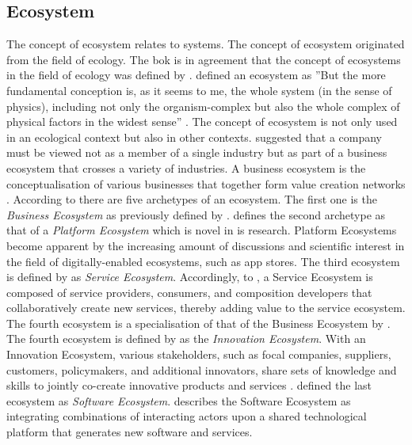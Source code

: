 \subsection{Ecosystem}
\label{sub:tbecosystem}
The concept of ecosystem relates to systems. The concept of ecosystem originated from the field of ecology. The \acrfull{bok} is in agreement that the concept of ecosystems in the field of ecology was defined by \textcite{Tansley1935}. \textcite[p.~299]{Tansley1935} defined an ecosystem as ''But the more fundamental conception is, as it seems to me, the whole system (in the sense of physics), including not only the organism-complex but also the whole complex of physical factors in the widest sense'' \parencites[p.~3]{Guggenberger2020}[p.~20]{Nurmi2021}. The concept of ecosystem is not only used in an ecological context but also in other contexts. \textcite[p.~76]{Moore1993} suggested that a company must be viewed not as a member of a single industry but as part of a business ecosystem that crosses a variety of industries. A business ecosystem is the conceptualisation of various businesses that together form value creation networks \parencite[p.~3]{Guggenberger2020}. According to \textcite[]{Guggenberger2020} there are five archetypes of an ecosystem. The first one is the \textit{Business Ecosystem} as previously defined by \textcite[p.~76]{Moore1993}. \textcite[p.~5]{Guggenberger2020} defines the second archetype as that of a \textit{Platform Ecosystem} which is novel in \acrfull{is} research. Platform Ecosystems become apparent by the increasing amount of discussions and scientific interest in the field of digitally-enabled ecosystems, such as app stores. The third ecosystem is defined by \textcite[p.~5]{Guggenberger2020} as \textit{Service Ecosystem}. Accordingly, to \textcites{Barros2006}{Papazoglou2006}{Huang2014}, a Service Ecosystem is composed of service providers, consumers, and composition developers that collaboratively create new services, thereby adding value to the service ecosystem. The fourth ecosystem is a specialisation of that of the Business Ecosystem by \textcite{Moore1993}. The fourth ecosystem is defined by \textcite[p.~5]{Guggenberger2020} as the \textit{Innovation Ecosystem}. With an Innovation Ecosystem, various stakeholders, such as focal companies, suppliers, customers, policymakers, and additional innovators, share sets of knowledge and skills to jointly co-create innovative products and services \parencites{Iansiti2004}{Gomes2018}{Carayannis2009}. \textcite[p.~5]{Guggenberger2020} defined the last ecosystem as \textit{Software Ecosystem}. \textcite{Manikas2013} describes the Software Ecosystem as integrating combinations of interacting actors upon a shared technological platform that generates new software and services.

